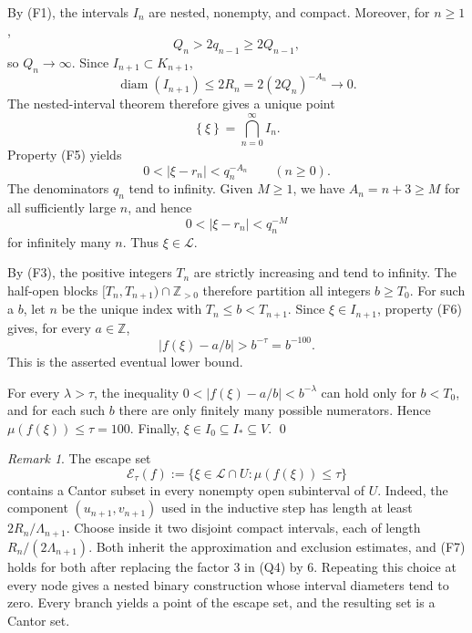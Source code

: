 \documentclass[11pt]{amsart}
\numberwithin{equation}{section}
\theoremstyle{definition}
\theoremstyle{remark}
\newtheorem{remark}[remark]{Remark}
\newcommand{\Z}{\mathbb Z}
\newcommand{\Lio}{\mathscr L}
\newcommand{\diam}{\operatorname{diam}}
\newcommand{\abs}[1]{\left\lvert #1\right\rvert}
\newcommand{\set}[1]{\left\{#1\right\}}
\begin{document}
By \textup{(F1)}, the intervals $I_n$ are nested, nonempty, and
compact. Moreover, for $n\geq1$,
\[
Q_n>2q_{n-1}\geq2Q_{n-1},
\]
so $Q_n\to\infty$. Since $I_{n+1}\subset K_{n+1}$,
\[
\diam(I_{n+1})\leq2R_n=2(2Q_n)^{-A_n}\longrightarrow0.
\]
The nested-interval theorem therefore gives a unique point
\begin{equation}\label{eq:xi-intersection-en}
\set{\xi}=\bigcap_{n=0}^{\infty}I_n.
\end{equation}
Property \textup{(F5)} yields
\begin{equation}\label{eq:xi-rn-en}
0<\abs{\xi-r_n}<q_n^{-A_n}
\qquad(n\geq0).
\end{equation}
The denominators $q_n$ tend to infinity. Given $M\geq1$, we have
$A_n=n+3\geq M$ for all sufficiently large $n$, and hence
\[
0<\abs{\xi-r_n}<q_n^{-M}
\]
for infinitely many $n$. Thus $\xi\in\Lio$.

By \textup{(F3)}, the positive integers $T_n$ are strictly increasing
and tend to infinity. The half-open blocks
$[T_n,T_{n+1})\cap\Z_{>0}$ therefore partition all integers $b\geq T_0$.
For such a $b$, let $n$ be the unique index with
$T_n\leq b<T_{n+1}$. Since $\xi\in I_{n+1}$, property \textup{(F6)}
gives, for every $a\in\Z$,
\begin{equation}\label{eq:image-lower-en}
\abs{f(\xi)-a/b}>b^{-\tau}=b^{-100}.
\end{equation}
This is the asserted eventual lower bound.

For every $\lambda>\tau$, the inequality
$0<|f(\xi)-a/b|<b^{-\lambda}$ can hold only for $b<T_0$,
and for each such $b$ there are only finitely many possible
numerators. Hence $\mu(f(\xi))\leq\tau=100$. Finally, $\xi\in I_0\subseteq I_*\subseteq V$.
\qed

\begin{remark}\label{rem:escape-set}
The escape set
\[
\mathcal E_\tau(f)
:=
\{\xi\in\Lio\cap U:\mu(f(\xi))\leq\tau\}
\]
contains a Cantor subset in every nonempty open subinterval
of $U$. Indeed, the component $(u_{n+1},v_{n+1})$ used in the
inductive step has length at least $2R_n/\Lambda_{n+1}$.
Choose inside it two disjoint compact intervals, each of length
$R_n/(2\Lambda_{n+1})$. Both inherit the approximation and
exclusion estimates, and \textup{(F7)} holds for both after replacing
the factor $3$ in \textup{(Q4)} by $6$. Repeating this choice at every
node gives a nested binary construction whose interval
diameters tend to zero. Every branch yields a point of the
escape set, and the resulting set is a Cantor set.
\end{remark}
\end{document}
